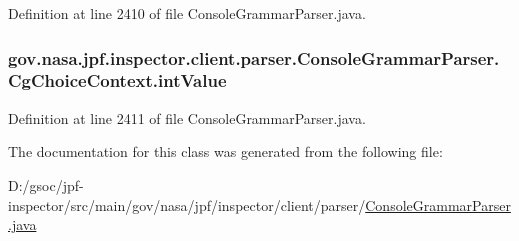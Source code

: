 Definition at line 2410 of file Console\+Grammar\+Parser.\+java.

\subsubsection[{\texorpdfstring{int\+Value}{intValue}}]{ gov.\+nasa.\+jpf.\+inspector.\+client.\+parser.\+Console\+Grammar\+Parser.\+Cg\+Choice\+Context.\+int\+Value}\hypertarget{classgov_1_1nasa_1_1jpf_1_1inspector_1_1client_1_1parser_1_1_console_grammar_parser_1_1_cg_choice_context_a7cf5e24e48cb0b76a040bf026c98c67c}{}\label{classgov_1_1nasa_1_1jpf_1_1inspector_1_1client_1_1parser_1_1_console_grammar_parser_1_1_cg_choice_context_a7cf5e24e48cb0b76a040bf026c98c67c}


Definition at line 2411 of file Console\+Grammar\+Parser.\+java.



The documentation for this class was generated from the following file\+:\begin{DoxyCompactItemize}
\item 
D\+:/gsoc/jpf-\/inspector/src/main/gov/nasa/jpf/inspector/client/parser/\hyperlink{_console_grammar_parser_8java}{Console\+Grammar\+Parser.\+java}\end{DoxyCompactItemize}
